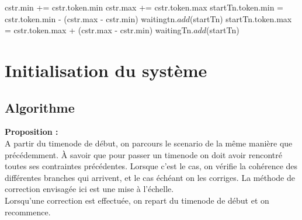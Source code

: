 \documentclass[10pt,a4paper]{article}
\begin{document}
	\begin{algorithm}
		\begin{algorithmic}[2]

					\State cstr.min += cstr.token.min
					\State cstr.max += cstr.token.max
					\State startTn.token.min = cstr.token.min - (cstr.max - cstr.min)
					\State waitingtn$.add$(startTn)
					\State startTn.token.max = cstr.token.max + (cstr.max - cstr.min)
					\State waitingTn$.add$(startTn)
				\EndIf
			\EndFunction
		\end{algorithmic}
	\end{algorithm}

\newpage
\section{Initialisation du système}
\label{section:init}

	\subsection{Algorithme}
\textbf{Proposition : }\\
A partir du timenode de début, on parcours le scenario de la même manière que précédemment. À savoir que pour passer un timenode on doit avoir rencontré toutes ses contraintes précédentes. Lorsque c'est le cas, on vérifie la cohérence des différentes branches qui arrivent, et le cas échéant on les corriges. La méthode de correction envisagée ici est une mise à l'échelle.\\
Lorsqu'une correction est effectuée, on repart du timenode de début et on recommence.
\end{document}
